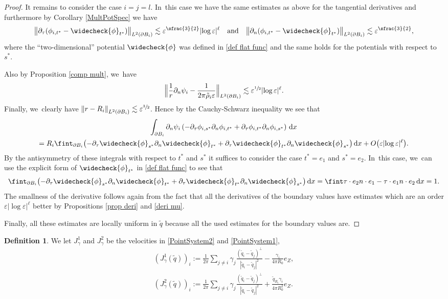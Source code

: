 \documentclass[JEP,XML,SOM,Unicode,published]{cedram}
\let\strokedint\fint
\let\epsilon\varepsilon
\theoremstyle{definition}
\newtheorem{definition}[theorem]{Definition}
\newcommand\norm[1]{\left\lVert #1\right\rVert}
\newcommand\bnorm[1]{\bigl\lVert #1\bigr\rVert}
\newcommand\Bnorm[1]{\Bigl\lVert #1\Bigr\rVert}
\newcommand\eq{=}
\newcommand\dd{\,\mathrm{d}}
\newcommand\dx{\dd x}
\let\chek\widecheck
\let\de\partial
\let\eps\epsilon
\begin{document}
\begin{proof}
It remains to consider the case $i=j=l$. In~this case we have the same estimates as above for the tangential derivatives and furthermore by Corollary \ref{MultPotSpec} we have
\begin{align*}
\bnorm{\de_\tau(\phi_{i,t^*}-\chek{\phi}_{t^*})}_{L^2(\de B_i)}\lesssim \eps^{\sfrac{3}{2}}|{\log\eps}|^\ell\quad\text{and}\quad \bnorm{\de_n(\phi_{i,t^*}-\chek{\phi}_{t^*})}_{L^2(\de B_i)}\lesssim \eps^{\sfrac{3}{2}},
\end{align*}
where the ``two-dimensional'' potential $\chek{\phi}$ was defined in \ref{def flat func} and the same holds for the potentials with respect to $s^*$.

Also by Proposition \ref{comp mult}, we~have
\begin{align*}
\Bnorm{\frac{1}{r}\de_n\psi_i-\frac{1}{2\pi\tilde{\rho}_i\eps}}_{L^2(\de B_i)}\lesssim \eps^{\sfrac{1}{2}}|{\log\eps}|^\ell.
\end{align*}
Finally, we~clearly have $\norm{r-R_i}_{L^2(\de B_i)}\lesssim \eps^{\sfrac{3}{2}}$. Hence by the Cauchy-Schwarz inequality we see that
\begin{multline*}
\int_{\de B_i}\de_n\psi_i\left(-\de_\tau\phi_{i,s^*}\de_n\phi_{i,t^*}+\de_\tau\phi_{i,t^*}\de_n\phi_{i,s^*}\right)\dx\notag\\
\eq R_i\strokedint_{\de B_i}\bigl(-\de_\tau\chek{\phi}_{s^*}\de_n\chek{\phi}_{t^*}+\de_\tau\chek{\phi}_{t^*}\de_n\chek{\phi}_{s^*}\bigr)\dx+O\bigl(\eps|{\log\eps}|^\ell\bigr).
\end{multline*}
By the antisymmetry of these integrals with respect to $t^*$ and $s^*$ it suffices to consider the case $t^*=e_1$ and $s^*=e_2$. In~this case, we~can use the explicit form of $\chek{\phi}_{t^*}$ in \ref{def flat func} to see that
\begin{align*}
\strokedint_{\de B_i} \bigl(-\de_\tau\chek{\phi}_{s^*}\de_n\chek{\phi}_{t^*}+\de_\tau\chek{\phi}_{t^*}\de_n\chek{\phi}_{s^*} \bigr)\dx\eq \strokedint \tau\cdot e_2n\cdot e_1-\tau\cdot e_1n\cdot e_2\dx\eq 1.
\end{align*}
The smallness of the derivative follows again from the fact that all the derivatives of the boundary values have estimates which are an order $\eps|{\log\eps}|^\ell$ better by Propositions \ref{prop deri} and \ref{deri mu}.

Finally, all these estimates are locally uniform in $\tilde{q}$ because all the used estimates for the boundary values are.\end{proof}

\begin{definition}\label{def J}
We let $J_\gamma^1$ and $J_\gamma^2$ be the velocities in \eqref{PointSystem2} and \eqref{PointSystem1}, \ie
\begin{align*}
(J_\gamma^1(\tilde{q}))_i:= \frac{1}{2\pi}\sum_{j\neq i}\gamma_j\frac{(\tilde{q}_i-\tilde{q}_j)^\perp}{|\tilde{q}_i-\tilde{q}_j|^2}-\frac{\gamma_i}{4\pi R_0}e_Z,\\
(J_\gamma^2(\tilde{q}))_i:= \frac{1}{2\pi}\sum_{j\neq i}\gamma_j\frac{(\tilde{q}_i-\tilde{q}_j)^\perp}{|\tilde{q}_i-\tilde{q}_j|^2}+\frac{\tilde{q}_{R_i}\gamma_i}{4\pi R_0^2}e_Z.
\end{align*}
\end{definition}
\end{document}
